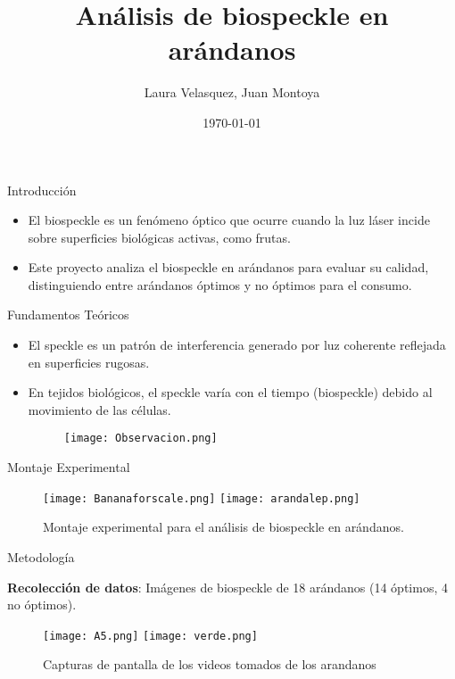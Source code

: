 \documentclass{beamer}
\title{Análisis de biospeckle en arándanos}
\author{Laura Velasquez, Juan Montoya}
\institute{FCEN@UdeA}
\date{\today}
\begin{document}
\begin{frame}
    \titlepage
\end{frame}

\begin{frame}{Introducción}
    \begin{itemize}
        \item El biospeckle es un fenómeno óptico que ocurre cuando la luz láser incide sobre superficies biológicas activas, como frutas.
        \item Este proyecto analiza el biospeckle en arándanos para evaluar su calidad, distinguiendo entre arándanos óptimos y no óptimos para el consumo.
    \end{itemize}
\end{frame}


\begin{frame}{Fundamentos Teóricos}
    \begin{itemize}
        \item El speckle es un patrón de interferencia generado por luz coherente reflejada en superficies rugosas.
        \item En tejidos biológicos, el speckle varía con el tiempo (biospeckle) debido al movimiento de las células.
        \\[0.5cm]
        \begin{figure}
            \texttt{[image: Observacion.png]}
        \end{figure}
    \end{itemize}
\end{frame}

\begin{frame}{Montaje Experimental}
    \begin{figure}
        \texttt{[image: Bananaforscale.png]}
        \texttt{[image: arandalep.png]}
        \caption{Montaje experimental para el análisis de biospeckle en arándanos.}
    \end{figure}
\end{frame}

\begin{frame}{Metodología}
    
    \textbf{Recolección de datos}: Imágenes de biospeckle de 18 arándanos (14 óptimos, 4 no óptimos).
    \begin{figure}
        \texttt{[image: A5.png]}
        \texttt{[image: verde.png]}
        \caption{Capturas de pantalla de los videos tomados de los arandanos}
    \end{figure}
\end{frame}
\end{document}
